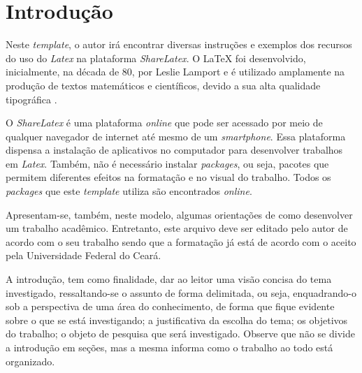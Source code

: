 \chapter{Introdução}
\label{cap:introducao}


Neste \textit{template}, o autor irá encontrar diversas instruções e exemplos dos recursos do uso do \textit{Latex} na plataforma \textit{ShareLatex}. O LaTeX foi desenvolvido, inicialmente, na década de 80, por Leslie Lamport e é utilizado amplamente na produção de textos matemáticos e científicos, devido a sua alta qualidade tipográfica \cite{goossens1994latex}. 

O \textit{ShareLatex} é uma plataforma \textit{online} que pode ser acessado por meio de qualquer navegador de internet até mesmo de um \textit{smartphone}. Essa plataforma dispensa a instalação de aplicativos no computador para desenvolver trabalhos em \textit{Latex}. Também, não é necessário instalar \textit{packages}, ou seja, pacotes que permitem diferentes efeitos na formatação e no visual do trabalho. Todos os \textit{packages} que este \textit{template} utiliza são encontrados \textit{online}. 

Apresentam-se, também, neste modelo, algumas orientações de como desenvolver um trabalho acadêmico. Entretanto, este arquivo deve ser editado pelo autor de acordo com o seu trabalho sendo que a formatação já está de acordo com o aceito pela Universidade Federal do Ceará.  

A introdução, tem como finalidade, dar ao leitor uma visão concisa do tema investigado, ressaltando-se o assunto de forma delimitada, ou seja, enquadrando-o sob a perspectiva de uma área do conhecimento, de forma que fique evidente sobre o que se está investigando; a justificativa da escolha do tema; os objetivos do trabalho; o objeto de pesquisa que será investigado. Observe que não se divide a introdução em seções, mas a mesma informa como o trabalho ao todo está organizado.



